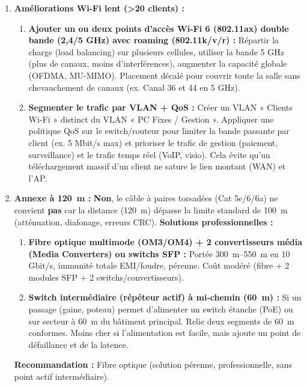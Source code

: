 \documentclass[11pt]{article}
\begin{document}
\begin{corrige}
\begin{enumerate}
  \item \textbf{Améliorations Wi-Fi lent (>20 clients) :}
  \begin{enumerate}
    \item \textbf{Ajouter un ou deux points d'accès Wi-Fi 6 (802.11ax) double bande (2,4/5 GHz) avec roaming (802.11k/v/r) :} Répartir la charge (load balancing) sur plusieurs cellules, utiliser la bande 5 GHz (plus de canaux, moins d'interférences), augmenter la capacité globale (OFDMA, MU-MIMO). Placement décalé pour couvrir toute la salle sans chevauchement de canaux (ex. Canal 36 et 44 en 5 GHz).
    \item \textbf{Segmenter le trafic par VLAN + QoS :} Créer un VLAN « Clients Wi-Fi » distinct du VLAN « PC Fixes / Gestion ». Appliquer une politique QoS sur le switch/routeur pour limiter la bande passante par client (ex. 5 Mbit/s max) et prioriser le trafic de gestion (paiement, surveillance) et le trafic temps réel (VoIP, visio). Cela évite qu'un téléchargement massif d'un client ne sature le lien montant (WAN) et l'AP.
  \end{enumerate}

  \item \textbf{Annexe à \SI{120}{m} :}
  \textbf{Non}, le câble à paires torsadées (Cat 5e/6/6a) ne convient \textbf{pas} car la distance (\SI{120}{m}) dépasse la limite standard de \SI{100}{m} (atténuation, diafonage, erreurs CRC).
  \textbf{Solutions professionnelles :}
  \begin{enumerate}
    \item \textbf{Fibre optique multimode (OM3/OM4) + 2 convertisseurs média (Media Converters) ou switchs SFP :} Portée \SI{300}{m}--\SI{550}{m} en 10 Gbit/s, immunité totale EMI/foudre, pérenne. Coût modéré (fibre + 2 modules SFP + 2 switchs/convertisseurs).
    \item \textbf{Switch intermédiaire (répéteur actif) à mi-chemin (\SI{60}{m}) :} Si un passage (gaine, poteau) permet d'alimenter un switch étanche (PoE) ou sur secteur à \SI{60}{m} du bâtiment principal. Relie deux segments de \SI{60}{m} conformes. Moins cher si l'alimentation est facile, mais ajoute un point de défaillance et de la latence.
  \end{enumerate}
  \textbf{Recommandation :} Fibre optique (solution pérenne, professionnelle, sans point actif intermédiaire).
\end{enumerate}
\end{corrige}
\end{document}
